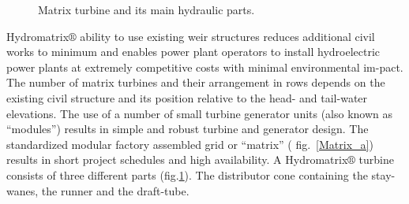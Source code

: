 \begin{figure}[h!]
\begin{minipage}[b]{0.5\linewidth}
 \centering
\end{minipage}
\begin{minipage}[b]{0.5\linewidth}
 \centering
\end{minipage}
\caption{Matrix turbine and its main hydraulic parts. }
\label{Matrix_c}
\end{figure}

Hydromatrix$\circledR$ ability to use existing weir structures reduces additional civil works to minimum and enables power plant operators to install hydroelectric power plants at extremely competitive costs with minimal environmental im-pact. The number of matrix turbines and their arrangement in rows depends on the existing civil structure and its position relative to the head- and tail-water elevations. The use of a number of small turbine generator units (also known as “modules”) results in simple and robust turbine and generator design. The standardized modular factory assembled grid or “matrix” ( fig.~\ref{Matrix_a}) results in short project schedules and high availability. A Hydromatrix$\circledR$ turbine consists of three different parts (fig.\ref{Matrix_c}). The distributor cone containing the stay-wanes, the runner and the draft-tube.



